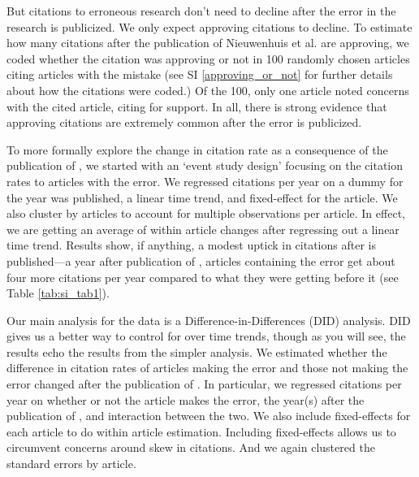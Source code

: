 \documentclass[12pt, letterpaper]{article}
\begin{document}
But citations to erroneous research don't need to decline after the error in the research is publicized. We only expect approving citations to decline. To estimate how many citations after the publication of Nieuwenhuis et al. are approving, we coded whether the citation was approving or not in 100 randomly chosen articles citing articles with the mistake (see SI \ref{approving_or_not} for further details about how the citations were coded.) Of the 100, only one article noted concerns with the cited article, citing \citep{nieuwenhuis2011} for support. In all, there is strong evidence that approving citations are extremely common after the error is publicized.

To more formally explore the change in citation rate as a consequence of the publication of \citet{nieuwenhuis2011}, we started with an `event study design' focusing on the citation rates to articles with the error. We regressed citations per year on a dummy for the year \citet{nieuwenhuis2011} was published, a linear time trend, and fixed-effect for the article. We also cluster by articles to account for multiple observations per article. In effect, we are getting an average of within article changes after regressing out a linear time trend. Results show, if anything, a modest uptick in citations after \citet{nieuwenhuis2011} is published---a year after publication of \citet{nieuwenhuis2011}, articles containing the error get about four more citations per year compared to what they were getting before it (see Table \ref{tab:si_tab1}).

Our main analysis for the \citeauthor{nieuwenhuis2011} data is a Difference-in-Differences (DID) analysis. DID gives us a better way to control for over time trends, though as you will see, the results echo the results from the simpler analysis. We estimated whether the difference in citation rates of articles making the error and those not making the error changed after the publication of \citet{nieuwenhuis2011}. In particular, we regressed citations per year on whether or not the article makes the error, the year(s) after the publication of \citet{nieuwenhuis2011}, and interaction between the two. We also include fixed-effects for each article to do within article estimation. Including fixed-effects allows us to circumvent concerns around skew in citations. And we again clustered the standard errors by article.
\end{document}
